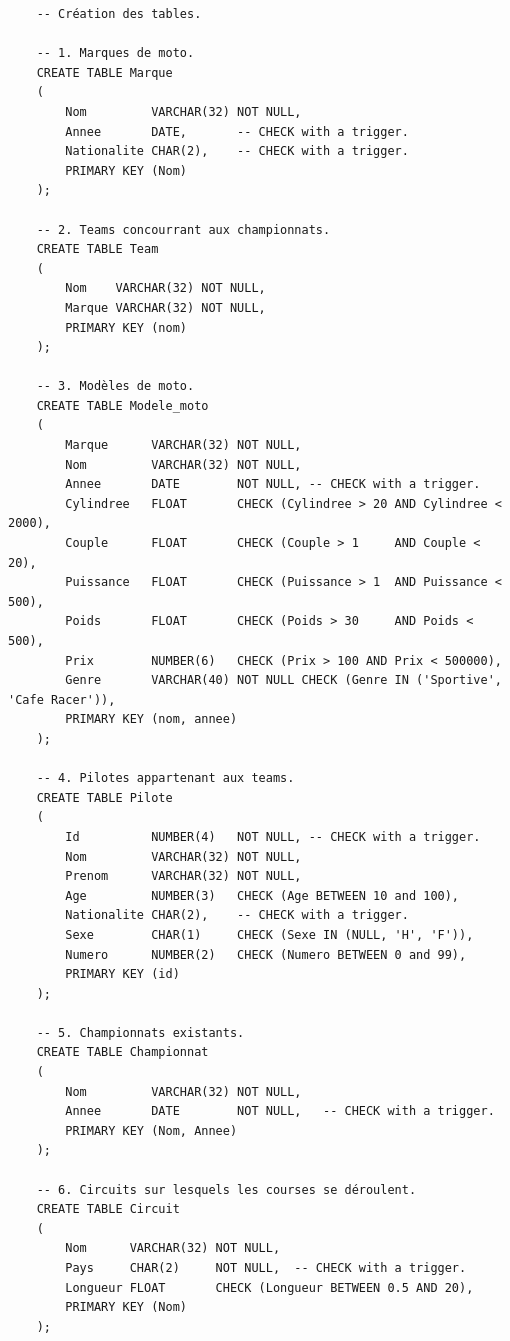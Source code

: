 \documentclass[12pt,a4paper]{article}
\newenvironment{code}{\captionsetup{type=listing}}{}
\begin{document}
\begin{code}
    \begin{verbatim}
    -- Création des tables.

    -- 1. Marques de moto.
    CREATE TABLE Marque
    (
        Nom         VARCHAR(32) NOT NULL,
        Annee       DATE,       -- CHECK with a trigger.
        Nationalite CHAR(2),    -- CHECK with a trigger.
        PRIMARY KEY (Nom)
    );

    -- 2. Teams concourrant aux championnats.
    CREATE TABLE Team
    (
        Nom    VARCHAR(32) NOT NULL,
        Marque VARCHAR(32) NOT NULL,
        PRIMARY KEY (nom)
    );

    -- 3. Modèles de moto.
    CREATE TABLE Modele_moto
    (
        Marque      VARCHAR(32) NOT NULL,
        Nom         VARCHAR(32) NOT NULL,
        Annee       DATE        NOT NULL, -- CHECK with a trigger.
        Cylindree   FLOAT       CHECK (Cylindree > 20 AND Cylindree < 2000),
        Couple      FLOAT       CHECK (Couple > 1     AND Couple < 20),
        Puissance   FLOAT       CHECK (Puissance > 1  AND Puissance < 500),
        Poids       FLOAT       CHECK (Poids > 30     AND Poids < 500),
        Prix        NUMBER(6)   CHECK (Prix > 100 AND Prix < 500000),
        Genre       VARCHAR(40) NOT NULL CHECK (Genre IN ('Sportive', 'Cafe Racer')),
        PRIMARY KEY (nom, annee)
    );

    -- 4. Pilotes appartenant aux teams.
    CREATE TABLE Pilote
    (
        Id          NUMBER(4)   NOT NULL, -- CHECK with a trigger.
        Nom         VARCHAR(32) NOT NULL,
        Prenom      VARCHAR(32) NOT NULL,
        Age         NUMBER(3)   CHECK (Age BETWEEN 10 and 100),
        Nationalite CHAR(2),    -- CHECK with a trigger.
        Sexe        CHAR(1)     CHECK (Sexe IN (NULL, 'H', 'F')),
        Numero      NUMBER(2)   CHECK (Numero BETWEEN 0 and 99),
        PRIMARY KEY (id)
    );

    -- 5. Championnats existants.
    CREATE TABLE Championnat
    (
        Nom         VARCHAR(32) NOT NULL,
        Annee       DATE        NOT NULL,   -- CHECK with a trigger.
        PRIMARY KEY (Nom, Annee)
    );

    -- 6. Circuits sur lesquels les courses se déroulent.
    CREATE TABLE Circuit
    (
        Nom      VARCHAR(32) NOT NULL,
        Pays     CHAR(2)     NOT NULL,  -- CHECK with a trigger.
        Longueur FLOAT       CHECK (Longueur BETWEEN 0.5 AND 20),
        PRIMARY KEY (Nom)
    );


\end{verbatim}
\end{code}
\end{document}
